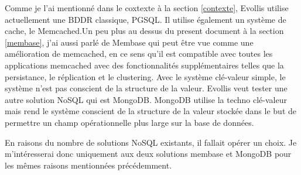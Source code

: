 Comme je l'ai mentionné dans le coxtexte à la section \ref{contexte}, Evollis utilise actuellement une
BDDR classique, PGSQL. Il utilise également un système de cache, le \textsf{Memcached}.Un peu plus au dessus
du present document à la section \ref{membase}, j'ai aussi parlé de Membase qui peut être vue comme une amélioration
de memcached, en ce sens qu'il est compatible avec toutes les applications memcached avec des fonctionnalités
supplémentaires telles que la persistance, le réplication et le clustering.  
Avec le système clé-valeur simple, le système n'est pas conscient de la structure de la valeur.
Evollis veut tester une autre solution NoSQL qui est MongoDB. MongoDB utilise la techno clé-valeur
mais rend le système conscient de la structure de la valeur stockée dans le but de permettre un champ
opérationnelle plus large sur la base de données.

En raisons du nombre de solutions \textsf{NoSQL} existants, il fallait opérer un choix. Je m'intéresserai donc uniquement
aux deux solutions membase et MongoDB pour les mêmes raisons mentionnées précédemment.  
